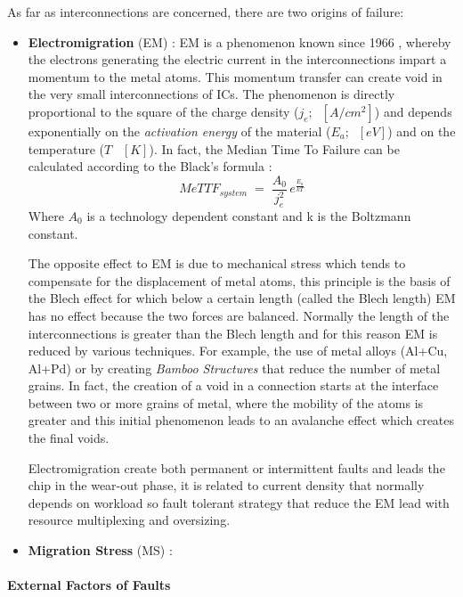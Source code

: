 {{{{				As far as interconnections are concerned, there are two origins of failure:
				\begin{itemize}
					\item \textbf{Electromigration} (EM) : EM is a phenomenon known since 1966 \cite{EM1989}, whereby the electrons generating the electric current in the interconnections impart a momentum to the metal atoms. This momentum transfer can create void in the very small interconnections of ICs. The phenomenon is directly proportional to the square of the charge density ($j_e;\;\; [A/cm^2]$) and depends exponentially on the \textit{activation energy} of the material ($E_a;\;\;[eV]$) and on the temperature ($T \;\;\;[K]$). In fact, the Median Time To Failure can be calculated according to the Black's formula \cite{Mukherjee2008}:	
					\begin{equation}
						MeTTF_{system} \;=\; \frac{A_0}{j_e^2}\,e^{\frac{E_a}{kT}} 
					\end{equation}
					Where $A_0$ is a technology dependent constant and k is the Boltzmann constant. 
					
					The opposite effect to EM is due to mechanical stress which tends to compensate for the displacement of metal atoms, this principle is the basis of the Blech effect for which below a certain length (called the Blech length) EM has no effect because the two forces are balanced. Normally the length of the interconnections is greater than the Blech length and for this reason EM is reduced by various techniques. For example, the use of metal alloys (Al+Cu, Al+Pd) or by creating \textit{Bamboo Structures} that reduce the number of metal grains. In fact, the creation of a void in a connection starts at the interface between two or more grains of metal, where the mobility of the atoms is greater and this initial phenomenon leads to an avalanche effect which creates the final voids.
					
					Electromigration create both permanent or intermittent faults and leads the chip in the wear-out phase, it is related to current density that normally depends on workload so fault tolerant strategy that reduce the EM lead with resource multiplexing and oversizing.
					
					\item \textbf{Migration Stress} (MS) : 
					
			\end{itemize}
			}
			\paragraph{External Factors of Faults}{
				
}}}}
